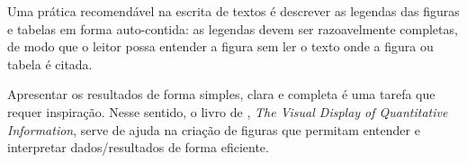 Uma prática recomendável na escrita de textos é descrever as legendas das
figuras e tabelas em forma auto-contida: as legendas devem ser razoavelmente
completas, de modo que o leitor possa entender a figura sem ler o texto onde a
figura ou tabela é citada.  

Apresentar os resultados de forma simples, clara e completa é uma tarefa que
requer inspiração. Nesse sentido, o livro de \citet{tufte01:visualDisplay},
\emph{The Visual Display of Quantitative Information}, serve de ajuda na
criação de figuras que permitam entender e interpretar dados/resultados de forma
eficiente.
\fi

